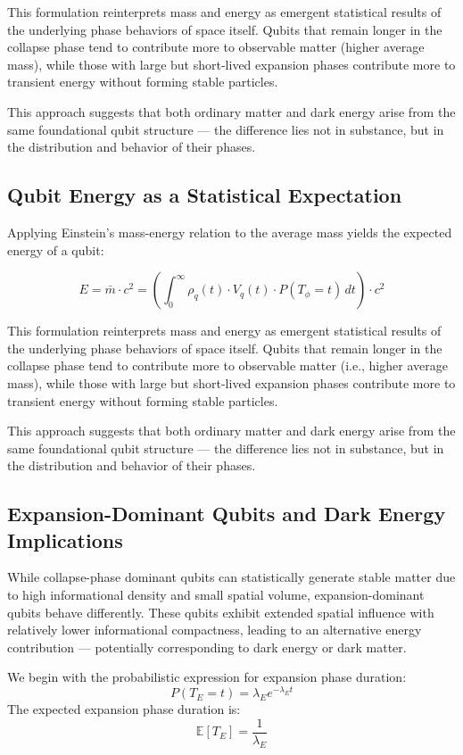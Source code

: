 \documentclass[12pt]{report} %
\begin{document}
This formulation reinterprets mass and energy as emergent statistical results of the underlying phase behaviors of space itself. Qubits that remain longer in the collapse phase tend to contribute more to observable matter (higher average mass), while those with large but short-lived expansion phases contribute more to transient energy without forming stable particles.

This approach suggests that both ordinary matter and dark energy arise from the same foundational qubit structure — the difference lies not in substance, but in the distribution and behavior of their phases.

\subsection{Qubit Energy as a Statistical Expectation}

Applying Einstein’s mass-energy relation to the average mass yields the expected energy of a qubit:

\[
E = \bar{m} \cdot c^2 = \left( \int_0^\infty \rho_q(t) \cdot V_q(t) \cdot P(T_\phi = t) \, dt \right) \cdot c^2
\]

This formulation reinterprets mass and energy as emergent statistical results of the underlying phase behaviors of space itself. Qubits that remain longer in the collapse phase tend to contribute more to observable matter (i.e., higher average mass), while those with large but short-lived expansion phases contribute more to transient energy without forming stable particles.

This approach suggests that both ordinary matter and dark energy arise from the same foundational qubit structure — the difference lies not in substance, but in the distribution and behavior of their phases.


\subsection{Expansion-Dominant Qubits and Dark Energy Implications}

While collapse-phase dominant qubits can statistically generate stable matter due to high informational density and small spatial volume, expansion-dominant qubits behave differently. These qubits exhibit extended spatial influence with relatively lower informational compactness, leading to an alternative energy contribution — potentially corresponding to dark energy or dark matter.

We begin with the probabilistic expression for expansion phase duration:
\[
P(T_E = t) = \lambda_E e^{-\lambda_E t}
\]
The expected expansion phase duration is:
\[
\mathbb{E}[T_E] = \frac{1}{\lambda_E}
\]
\end{document}
